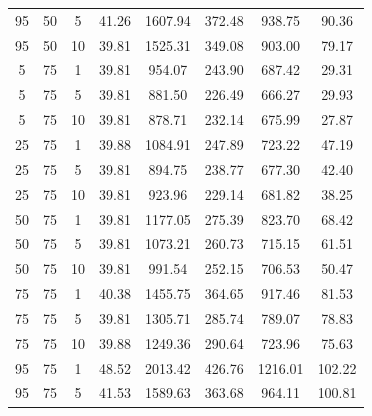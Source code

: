\begin{table}[H]
\begin{tabular}{ccc|c|c|c|c|c}
95 & 50 & 5 & \cellcolor{gray!66}41.26 & \cellcolor{gray!1}1607.94 & \cellcolor{gray!1}372.48 & \cellcolor{gray!1}938.75 & 90.36\\
95 & 50 & 10 & \cellcolor{gray!80}39.81 & \cellcolor{gray!1}1525.31 & \cellcolor{gray!1}349.08 & \cellcolor{gray!6}903.00 & 79.17\\
5 & 75 & 1 & \cellcolor{gray!80}39.81 & \cellcolor{gray!42}954.07 & \cellcolor{gray!18}243.90 & \cellcolor{gray!72}687.42 & 29.31\\
5 & 75 & 5 & \cellcolor{gray!80}39.81 & \cellcolor{gray!55}881.50 & \cellcolor{gray!34}226.49 & \cellcolor{gray!79}666.27 & 29.93\\
5 & 75 & 10 & \cellcolor{gray!80}39.81 & \cellcolor{gray!55}878.71 & \cellcolor{gray!29}232.14 & \cellcolor{gray!76}675.99 & 27.87\\
25 & 75 & 1 & \cellcolor{gray!80}39.88 & \cellcolor{gray!21}1084.91 & \cellcolor{gray!14}247.89 & \cellcolor{gray!61}723.22 & 47.19\\
25 & 75 & 5 & \cellcolor{gray!80}39.81 & \cellcolor{gray!52}894.75 & \cellcolor{gray!22}238.77 & \cellcolor{gray!75}677.30 & 42.40\\
25 & 75 & 10 & \cellcolor{gray!80}39.81 & \cellcolor{gray!47}923.96 & \cellcolor{gray!31}229.14 & \cellcolor{gray!74}681.82 & 38.25\\
50 & 75 & 1 & \cellcolor{gray!80}39.81 & \cellcolor{gray!5}1177.05 & \cellcolor{gray!1}275.39 & \cellcolor{gray!30}823.70 & 68.42\\
50 & 75 & 5 & \cellcolor{gray!80}39.81 & \cellcolor{gray!23}1073.21 & \cellcolor{gray!2}260.73 & \cellcolor{gray!63}715.15 & 61.51\\
50 & 75 & 10 & \cellcolor{gray!80}39.81 & \cellcolor{gray!36}991.54 & \cellcolor{gray!10}252.15 & \cellcolor{gray!66}706.53 & 50.47\\
75 & 75 & 1 & \cellcolor{gray!75}40.38 & \cellcolor{gray!1}1455.75 & \cellcolor{gray!1}364.65 & \cellcolor{gray!1}917.46 & 81.53\\
75 & 75 & 5 & \cellcolor{gray!80}39.81 & \cellcolor{gray!1}1305.71 & \cellcolor{gray!1}285.74 & \cellcolor{gray!41}789.07 & 78.83\\
75 & 75 & 10 & \cellcolor{gray!80}39.88 & \cellcolor{gray!1}1249.36 & \cellcolor{gray!1}290.64 & \cellcolor{gray!61}723.96 & 75.63\\
95 & 75 & 1 & \cellcolor{gray!1}48.52 & \cellcolor{gray!1}2013.42 & \cellcolor{gray!1}426.76 & \cellcolor{gray!1}1216.01 & 102.22\\
95 & 75 & 5 & \cellcolor{gray!63}41.53 & \cellcolor{gray!1}1589.63 & \cellcolor{gray!1}363.68 & \cellcolor{gray!1}964.11 & 100.81\\

\end{tabular}
\end{table}
